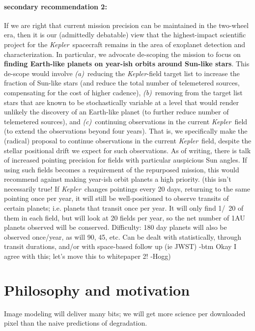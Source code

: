 \documentclass[12pt]{article}
\newcommand{\observatory}[1]{\textsl{#1}}
\newcommand{\kepler}{\observatory{Kepler}}
\newcommand{\Kepler}{\kepler}
\begin{document}
\paragraph{secondary recommendation 2:}
If we are right that current mission precision can be maintained in the two-wheel era,
  then it is our (admittedly debatable) view that the highest-impact scientific project for the \Kepler\ spacecraft
  remains in the area of exoplanet detection and characterization.
In particular, we advocate de-scoping the mission to focus on
  \textbf{finding Earth-like planets on year-ish orbits around Sun-like stars}.
This de-scope would involve
  \textsl{(a)}~reducing the \Kepler-field target list to increase the fraction of Sun-like stars
  (and reduce the total number of telemetered sources, compensating for the cost of higher cadence),
  \textsl{(b)}~removing from the target list stars that are known to be stochastically variable
  at a level that would render unlikely the discovery of an Earth-like planet
  (to further reduce number of telemetered sources),
  and \textsl{(c)}~continuing observations in the current \Kepler\ field
  (to extend the observations beyond four years).
That is, we specifically make the (radical) proposal to continue observations in the current \Kepler\ field,
  despite the stellar positional drift we expect for such observations.
As of writing, there is talk of increased pointing precision for fields with particular auspicious Sun angles.
If using such fields becomes a requirement of the repurposed mission,
  this would recommend against making year-ish orbit planets a high priority.
  (this isn't necessarily true! If \Kepler\ changes pointings every 20 days, returning to the same pointing once
  per year, it will still be well-positioned to observe transits of certain planets; i.e. planets that transit
  once per year. It will only find 1/~20 of them in each field, but will look at 20 fields per year, so the
  net number of 1AU planets observed will be conserved. Difficulty: 180 day planets will also be observed once/year,
  as will 90, 45, etc. Can be dealt with statistically, through transit durations, and/or with space-based follow up
  (ie JWST) -btm  Okay I agree with this; let's move this to whitepaper 2! -Hogg)

\section{Philosophy and motivation}

Image modeling will deliver many bits; we will get more science per
downloaded pixel than the naive predictions of degradation.
\end{document}
